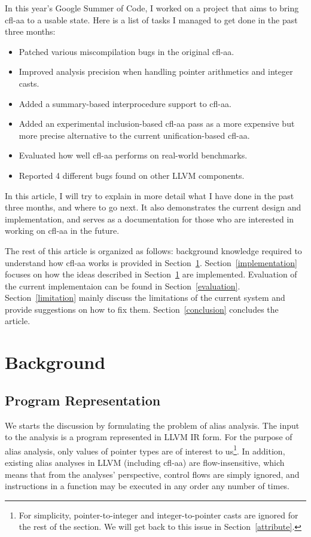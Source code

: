 \documentclass[10pt]{article}
\begin{document}
In this year's Google Summer of Code, I worked on a project that aims to bring 
cfl-aa to a usable state. Here is a list of tasks I managed to get done in the
past three months:
\begin{itemize}
  \item Patched various miscompilation bugs in the original cfl-aa. 
  \item Improved analysis precision when handling pointer arithmetics and
    integer casts.
  \item Added a summary-based interprocedure support to cfl-aa.
  \item Added an experimental inclusion-based cfl-aa pass as a more expensive
    but more precise alternative to the current unification-based cfl-aa.
  \item Evaluated how well cfl-aa performs on real-world benchmarks.
  \item Reported 4 different bugs found on other LLVM components.
\end{itemize}

In this article, I will try to explain in more detail what I have
done in the past three months, and where to go next. It also demonstrates the current design and implementation, and
serves as a documentation for those who are interested in
working on cfl-aa in the future.

The rest of this article is organized as follows: background knowledge required
to understand how cfl-aa works is provided in Section~\ref{background}.
Section~\ref{implementation} focuses on how the ideas described in
Section~\ref{background} are implemented. Evaluation of the current
implementaion can be found in Section~\ref{evaluation}. Section~\ref{limitation}
mainly discuss the limitations of the current system
and provide suggestions on how to fix them. Section~\ref{conclusion} concludes
the article.

\section{Background}\label{background}

\subsection{Program Representation}
We starts the discussion by formulating the problem of alias analysis. The input
to the analysis is a program represented in LLVM IR form. For the purpose of
alias analysis, only values of pointer types are of interest to us\footnote{For
  simplicity, pointer-to-integer and integer-to-pointer casts are ignored for the rest of the section. We
  will get back to this issue in Section~\ref{attribute}.}. In addition,
existing alias analyses in LLVM (including cfl-aa) are flow-insensitive, which
means that from the analyses' perspective, control flows are simply ignored, and
instructions in a function may be executed in any order any number of times.
\end{document}

